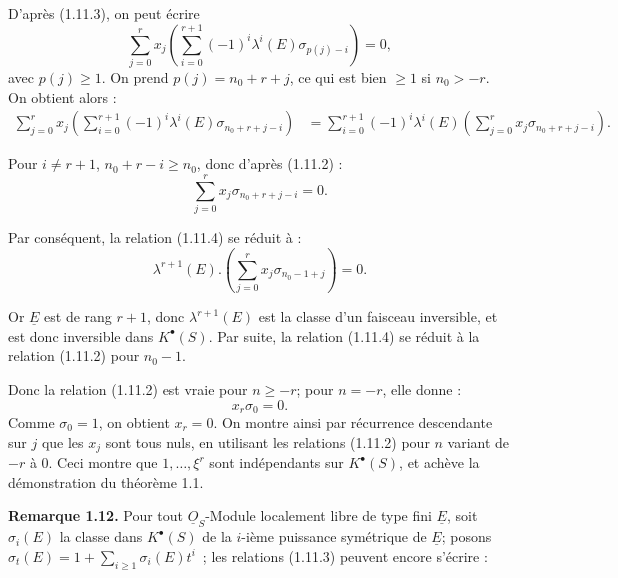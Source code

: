 
D'après (1.11.3), on
peut écrire
\[
  \sum_{j=0}^r x_j\left(\sum_{i=0}^{r+1}(-1)^i\lambda^i(E)\sigma_{p(j)-i}\right)=0,
\]
avec \(p(j)\geq1\). On prend \(p(j)=n_0+r+j\), ce qui est bien \(\geq1\) si \(n_0>-r\). On obtient alors :
\[
\begin{aligned}
\sum_{j=0}^r x_j\left(\sum_{i=0}^{r+1}(-1)^i\lambda^i(E)\sigma_{n_0+r+j-i}\right)
&=\sum_{i=0}^{r+1}(-1)^i\lambda^i(E)
   \left(\sum_{j=0}^r x_j\sigma_{n_0+r+j-i}\right).
\end{aligned}
\]

Pour \(i\neq r+1\), \(n_0+r-i\geq n_0\), donc d'après (1.11.2) :
\[
  \sum_{j=0}^r x_j\sigma_{n_0+r+j-i}=0.
\]

Par conséquent, la relation (1.11.4) se réduit à :
\[
  \lambda^{r+1}(E).\left(\sum_{j=0}^r x_j\sigma_{n_0-1+j}\right)=0.
\]

Or \(\underline{E}\) est de rang \(r+1\), donc \(\lambda^{r+1}(E)\) est la classe d'un faisceau inversible, et est donc inversible dans \(K^{\bullet}(S)\). Par suite, la relation (1.11.4) se réduit à la relation (1.11.2) pour \(n_0-1\).

Donc la relation (1.11.2) est vraie pour \(n\geq-r\); pour \(n=-r\), elle donne :
\[
  x_r\sigma_0=0.
\]
Comme \(\sigma_0=1\), on obtient \(x_r=0\). On montre ainsi par récurrence descendante sur \(j\) que les \(x_j\) sont tous nuls, en utilisant les relations (1.11.2) pour \(n\) variant de \(-r\) à \(0\). Ceci montre que \(1,\ldots,\xi^r\) sont indépendants sur \(K^{\bullet}(S)\), et achève la démonstration du théorème 1.1.

\textbf{Remarque 1.12.} Pour tout \(\underline{O}_S\)-Module localement libre de type fini \(\underline{E}\), soit \(\sigma_i(E)\) la classe dans \(K^{\bullet}(S)\) de la \(i\)-ième puissance symétrique de \(\underline{E}\); posons \(\sigma_t(E)=1+\sum_{i\geq1}\sigma_i(E)t^i\)~; les relations (1.11.3) peuvent encore s'écrire :

